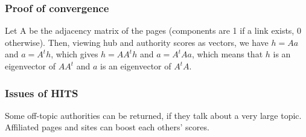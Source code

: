 \subsubsection{Proof of convergence}

Let A be the adjacency matrix of the pages (components are 1 if a link exists, 0 otherwise). Then, viewing hub and authority scores as vectors, we have $h = Aa$ and $a = A^t h$, which gives $h = AA^t h$ and $a = A^t Aa$, which means that $h$ is an eigenvector of $AA^t$ and $a$ is an eigenvector of $A^tA$.

\subsubsection{Issues of HITS}

Some off-topic authorities can be returned, if they talk about a very large topic.
Affiliated pages and sites can boost each others' scores.
